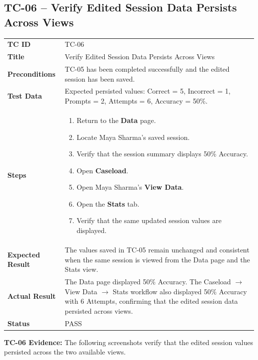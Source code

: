 \documentclass[11pt,a4paper]{article}
\begin{document}

\clearpage

\subsection{TC-06 -- Verify Edited Session Data Persists Across Views}

\begin{tabularx}{\textwidth}{>{\bfseries}p{}X}
TC ID & TC-06 \\
Title & Verify Edited Session Data Persists Across Views \\
Preconditions & TC-05 has been completed successfully and the edited session has been saved. \\
Test Data & Expected persisted values: Correct = 5, Incorrect = 1, Prompts = 2, Attempts = 6, Accuracy = 50\%. \\
Steps & \begin{enumerate}[leftmargin=*]
    \item Return to the \textbf{Data} page.
    \item Locate Maya Sharma's saved session.
    \item Verify that the session summary displays 50\% Accuracy.
    \item Open \textbf{Caseload}.
    \item Open Maya Sharma's \textbf{View Data}.
    \item Open the \textbf{Stats} tab.
    \item Verify that the same updated session values are displayed.
\end{enumerate} \\
Expected Result & The values saved in TC-05 remain unchanged and consistent when the same session is viewed from the Data page and the Stats view. \\
Actual Result & The Data page displayed 50\% Accuracy. The Caseload $\rightarrow$ View Data $\rightarrow$ Stats workflow also displayed 50\% Accuracy with 6 Attempts, confirming that the edited session data persisted across views. \\
Status & PASS
\end{tabularx}

\vspace{0.4cm}

\noindent
\textbf{TC-06 Evidence:} The following screenshots verify that the edited session values persisted across the two available views.
\end{document}
